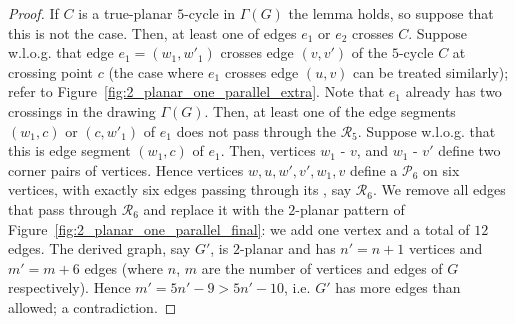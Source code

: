\begin{proof}
If $C$ is a true-planar $5$-cycle in $\Gamma(G)$ the lemma holds, so suppose that this is not the case. Then, at least one of edges $e_1$ or $e_2$ crosses $C$. Suppose w.l.o.g. that  edge $e_1=(w_1,w'_1)$ crosses edge $(v,v')$ of the $5$-cycle $C$ at crossing point $c$ (the case where $e_1$ crosses edge $(u,v)$ can be treated similarly); refer to Figure~\ref{fig:2_planar_one_parallel_extra}. Note that $e_1$ already has two crossings in the drawing $\Gamma(G)$. Then, at least one of the edge segments $(w_1,c)$ or $(c,w'_1)$ of $e_1$ does not pass through the \pr $\mathcal{R}_5$. Suppose w.l.o.g. that this is edge segment $(w_1,c)$  of $e_1$. Then, vertices $w_1$ - $v$, and $w_1$ - $v'$ define two corner pairs of vertices. Hence vertices $w,u,w',v',w_1,v$ define a \pp $\mathcal{P}_6$ on six vertices, with exactly six edges passing through its \pr, say $\mathcal{R}_6$. We remove all edges that pass through $\mathcal{R}_6$ and replace it with the $2$-planar pattern of Figure~\ref{fig:2_planar_one_parallel_final}: we add one vertex and a total of $12$ edges. The derived graph, say $G'$, is $2$-planar and has $n'=n+1$ vertices and $m'=m+6$ edges (where $n$, $m$ are the number of vertices and edges of $G$ respectively). Hence $m'=5n'-9>5n'-10$, i.e. $G'$ has more edges than allowed; a contradiction.

\end{proof}

